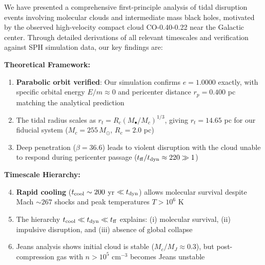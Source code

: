 \documentclass[twocolumn,amsmath,amssymb,prd,superscriptaddress,nofootinbib]{revtex4-2}
\begin{document}
We have presented a comprehensive first-principle analysis of tidal disruption events involving molecular clouds and intermediate mass black holes, motivated by the observed high-velocity compact cloud CO-0.40-0.22 near the Galactic center. Through detailed derivations of all relevant timescales and verification against SPH simulation data, our key findings are:

\textbf{Theoretical Framework:}
\begin{enumerate}
    \item \textbf{Parabolic orbit verified}: Our simulation confirms $e = 1.0000$ exactly, with specific orbital energy $E/m \approx 0$ and pericenter distance $r_p = 0.400$ pc matching the analytical prediction

    \item The tidal radius scales as $r_t = R_c(M_\bullet/M_c)^{1/3}$, giving $r_t = 14.65$ pc for our fiducial system ($M_c = 255\,M_\odot$, $R_c = 2.0$ pc)

    \item Deep penetration ($\beta = 36.6$) leads to violent disruption with the cloud unable to respond during pericenter passage ($t_{\rm ff}/t_{\rm dyn} \approx 220 \gg 1$)
\end{enumerate}

\textbf{Timescale Hierarchy:}
\begin{enumerate}
    \setcounter{enumi}{3}
    \item \textbf{Rapid cooling} ($t_{\rm cool} \sim 200$ yr $\ll t_{\rm dyn}$) allows molecular survival despite Mach $\sim 267$ shocks and peak temperatures $T > 10^6$ K

    \item The hierarchy $t_{\rm cool} \ll t_{\rm dyn} \ll t_{\rm ff}$ explains: (i) molecular survival, (ii) impulsive disruption, and (iii) absence of global collapse

    \item Jeans analysis shows initial cloud is stable ($M_c/M_J \approx 0.3$), but post-compression gas with $n > 10^5$ cm$^{-3}$ becomes Jeans unstable
\end{enumerate}
\end{document}
